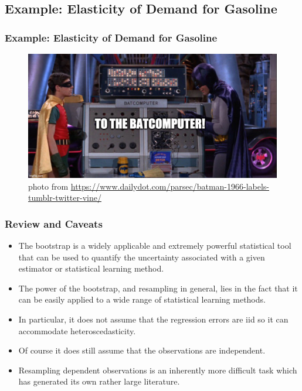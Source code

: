 \documentclass[
  shownotes,
  xcolor={svgnames},
  hyperref={colorlinks,citecolor=DarkBlue,linkcolor=andesred,urlcolor=DarkBlue}
  , aspectratio=169]{beamer}
\begin{document}
\subsection{Example: Elasticity of Demand for Gasoline}
\begin{frame}[fragile]
\frametitle{Example: Elasticity of Demand for Gasoline}
\begin{figure}[H] \centering
  \centering
  \includegraphics[scale=0.35]{figures/baticomputer_meme.jpg}
  \\
  \tiny photo from \url{https://www.dailydot.com/parsec/batman-1966-labels-tumblr-twitter-vine/}
\end{figure}

 \end{frame}

\begin{frame}[fragile]
\frametitle{Review and Caveats}

\begin{itemize}
  \item The bootstrap is a widely applicable and extremely powerful statistical tool that can be used to quantify the uncertainty associated with a given estimator or statistical learning method. 
  \medskip
  \item The power of the bootstrap, and resampling in general, lies in the fact that it can be easily applied to a wide range of statistical learning methods.
  \medskip
  \item In particular, it does not assume that the regression errors are iid so it can accommodate heteroscedasticity.
 \medskip
  \item Of course it does still assume that the observations are independent. 
  \medskip
  \item Resampling dependent observations is an inherently more difficult task which has generated its own rather large literature. 
\end{itemize}


\end{frame}

\end{document}
